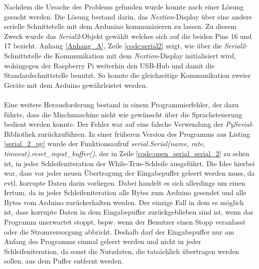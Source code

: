 \noindent
Nachdem die Ursache des Problems gefunden wurde konnte nach einer Lösung gesucht werden. Die Lösung bestand darin, das \textit{Nextion}-Display über eine andere serielle Schnittstelle mit dem Ardunino kommunizieren zu lassen. Zu diesem Zweck wurde das \textit{Serial2}-Objekt gewählt welches sich auf die beiden Pins 16 und 17 bezieht. Anhang \ref{Anhang_A}, Zeile \ref{code:serial2} zeigt, wie über die \textit{Serial2}-Schnittstelle die Kommunikation mit dem \textit{Nextion}-Display initialisiert wird, wohingegen der Raspberry Pi weiterhin den USB-Hub und damit die Standardschnittstelle benutzt. So konnte die gleichzeitige Kommunikation zweier Geräte mit dem Arduino gewährleistet werden.\\\\
Eine weitere Herausforderung bestand in einem Programmierfehler, der dazu führte, dass die Mischmaschine nicht wie gewünscht über die Sprachsteuerung bedient werden konnte. Der Fehler war auf eine falsche Verwendung der \textit{PySerial}-Bibliothek zurückzuführen. In einer früheren Version des Programms aus Listing \ref{serial_2_py} wurde der Funktionsaufruf \textit{serial.Serial(name, rate, timeout).reset\_input\_buffer()}, der in Zeile \ref{code:open_serial_serial_2} zu sehen ist, in jeder Schleifeniteration der While-True-Schleife ausgeführt. Die Idee hierbei war, dass vor jeder neuen Übertragung der Eingabepuffer geleert werden muss, da evtl. korrupte Daten darin vorliegen. Dabei handelt es sich allerdings um einen Irrtum, da in jeder Schleifeniteration alle Bytes zum Arduino gesendet und alle Bytes vom Arduino zurückerhalten werden. Der einzige Fall in dem es möglich ist, dass korrupte Daten in dem Eingabepuffer zurückgeblieben sind ist, wenn das Programm unerwartet stoppt, bspw. wenn der Benutzer einen Stopp veranlasst oder die Stromversorgung abbricht. Deshalb darf der Eingabepuffer nur am Anfang des Programms einmal geleert werden und nicht in jeder Schleifeniteration, da sonst die Nutzdaten, die tatsächlich übertragen werden sollen, aus dem Puffer entfernt werden.
